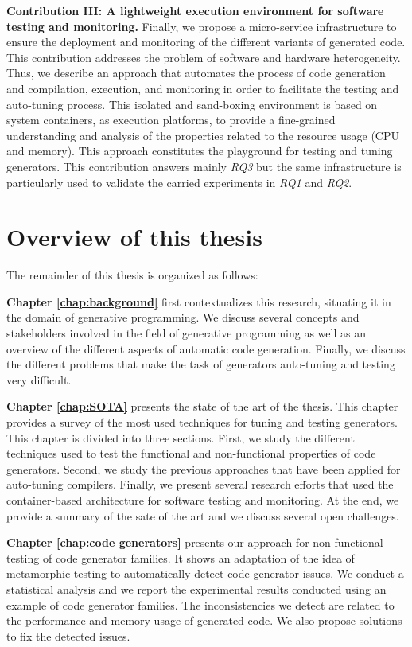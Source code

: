 \textbf{Contribution III: A lightweight execution environment for software testing and monitoring.}
Finally, we propose a micro-service infrastructure to ensure the deployment and monitoring of the different variants of generated code. This contribution addresses the problem of software and hardware heterogeneity. Thus, we describe an approach that automates the process of code generation and compilation, execution, and monitoring in order to facilitate the testing and auto-tuning process.
This isolated and sand-boxing environment is based on system containers, as execution platforms, to provide a fine-grained understanding and analysis of the properties related to the resource usage (CPU and memory). 
This approach constitutes the playground for testing and tuning generators. This contribution answers mainly \textit{RQ3} but the same infrastructure is particularly used to validate the carried experiments in \textit{RQ1} and \textit{RQ2}.
\newpage
\section{Overview of this thesis}
The remainder of this thesis is organized  as follows:

\textbf{Chapter \ref{chap:background}} first contextualizes this research, situating it in the domain of generative programming. We discuss several concepts and stakeholders involved in the field of generative programming as well as an overview of the different aspects of automatic code generation. Finally, we discuss the different problems that make the task of generators auto-tuning and testing very difficult.

\textbf{Chapter \ref{chap:SOTA}} presents the state of the art of the thesis. This chapter provides a survey of the most used techniques for tuning and testing generators.
This chapter is divided into three sections. First, we study the different techniques used to test the functional and non-functional properties of code generators. Second, we study the previous approaches that have been applied for auto-tuning compilers. Finally, we present several research efforts that used the container-based architecture for software testing and monitoring. At the end, we provide a summary of the sate of the art and we discuss several open challenges.

\textbf{Chapter \ref{chap:code generators}} presents our approach for non-functional testing of code generator families. It shows an adaptation of the idea of metamorphic testing to automatically detect code generator issues. We conduct a statistical analysis and we report the experimental results conducted using an example of code generator families. The inconsistencies we detect are related to the performance and memory usage of generated code. We also propose solutions to fix the detected issues.

